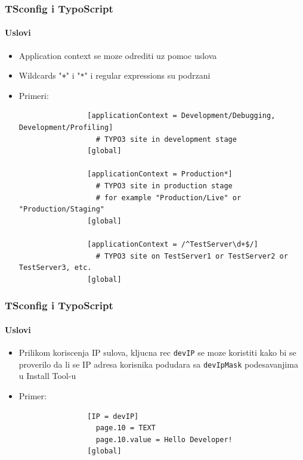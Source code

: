 \begin{frame}[fragile]
	\frametitle{TSconfig i TypoScript}
	\framesubtitle{Uslovi}

	\begin{itemize}
		\item Application context se moze odrediti uz pomoc uslova
		\item Wildcards "\texttt{+}" i "\texttt{*}" i regular expressions su podrzani
		\item Primeri:

			\lstset{
				basicstyle=\tiny\ttfamily
			}

			\begin{lstlisting}
				[applicationContext = Development/Debugging, Development/Profiling]
				  # TYPO3 site in development stage
				[global]

				[applicationContext = Production*]
				  # TYPO3 site in production stage
				  # for example "Production/Live" or "Production/Staging"
				[global]

				[applicationContext = /^TestServer\d+$/]
				  # TYPO3 site on TestServer1 or TestServer2 or TestServer3, etc.
				[global]
			\end{lstlisting}

	\end{itemize}

\end{frame}


\begin{frame}[fragile]
	\frametitle{TSconfig i TypoScript}
	\framesubtitle{Uslovi}

	\begin{itemize}

		\item Prilikom koriscenja IP sulova, kljucna rec \texttt{devIP} se moze koristiti kako bi se proverilo da li se IP adresa korisnika podudara sa \texttt{devIpMask} podesavanjima u Install Tool-u
		\item Primer:


			\begin{lstlisting}
				[IP = devIP]
				  page.10 = TEXT
				  page.10.value = Hello Developer!
				[global]
			\end{lstlisting}

	\end{itemize}

\end{frame}


